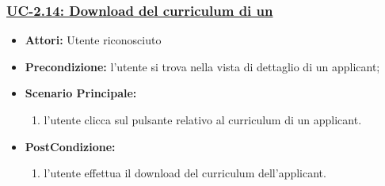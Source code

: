 \subsubsection{\underline{UC-2.14: Download del curriculum di un \applicant}}
\begin{itemize}
	\item \textbf{Attori:} Utente riconosciuto
	\item \textbf{Precondizione:}  l'utente si trova nella vista di dettaglio di un applicant;
	\item \textbf{Scenario Principale:}
	\begin{enumerate}
		\item l'utente clicca sul pulsante relativo al curriculum di un applicant.
	\end{enumerate}
	\item \textbf{PostCondizione:} 
	\begin{enumerate}
		\item l'utente effettua il download del curriculum dell'applicant.
	\end{enumerate}
	
\end{itemize}

